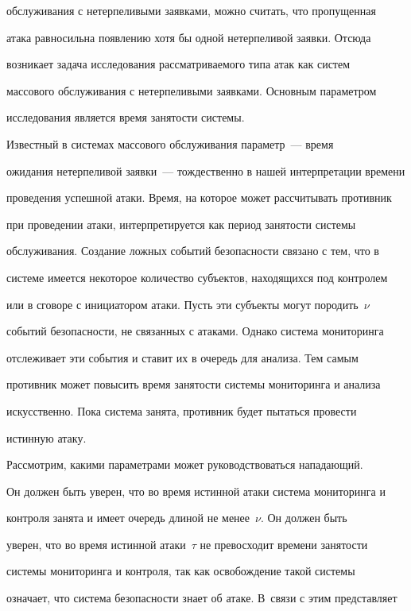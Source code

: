 обслуживания с нетерпеливыми заявками, можно считать, что пропущенная 

атака равносильна появлению хотя бы одной нетерпеливой заявки. Отсюда 

возникает задача исследования рассматриваемого типа атак как систем 

массового обслуживания с нетерпеливыми заявками. Основным параметром 

исследования является время занятости системы. 

    

    Известный в системах массового обслуживания параметр~--- время 

ожидания нетерпеливой заявки~--- тождественно в нашей интерпретации времени 

проведения успешной атаки. Время, на которое может рассчитывать противник 

при проведении атаки, интерпретируется как период занятости системы 

обслуживания. Создание ложных событий безопасности связано с тем, что в 

системе имеется некоторое количество субъектов, находящихся под контролем 

или в сговоре с инициатором атаки. Пусть эти субъекты могут породить~$\nu$ 

событий безопасности, не связанных с атаками. Однако система мониторинга 

отслеживает эти события и ставит их в очередь для анализа. Тем самым 

противник может повысить время занятости системы мониторинга и анализа 

искусственно. Пока система занята, противник будет пытаться провести 

истинную атаку. 

    

    Рассмотрим, какими параметрами может руководствоваться нападающий. 

Он должен быть уверен, что во время истинной атаки система мониторинга и 

контроля занята и имеет очередь длиной не менее~$\nu$. Он должен быть 

уверен, что во время истинной атаки~$\tau$ не превосходит времени занятости 

системы мониторинга и контроля, так как освобождение такой системы 

означает, что система безопасности знает об атаке. В~связи с этим представляет 

